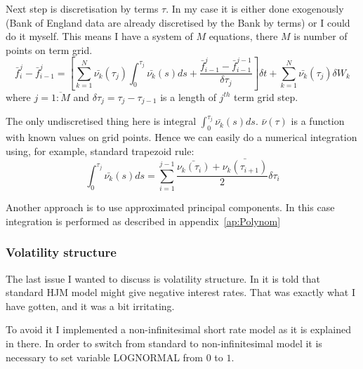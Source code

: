 \documentclass[11pt]{article} %
\begin{document}
Next step is discretisation by terms $\tau$. In my case it is either done exogenously (Bank of England data are already discretised by the Bank by terms) or I could do it myself. This means I have a system of $M$ equations, there $M$ is number of points on term grid.
\begin{equation} \label{eq:hjm_musiela_multidim_discrete}
\bar{f}_i^j - \bar{f}_{i-1}^j = \left[\sum_{k=1}^N\bar{\nu_k}(\tau_j)\int_{0}^{\tau_j}\bar{\nu_k}(s)ds+ \frac{\bar{f}_{i-1}^j-\bar{f}_{i-1}^{j-1}}{\delta\tau_j}\right]\delta t + \sum_{k=1}^N\bar{\nu_k}(\tau_j)\delta W_{k}
\end{equation}
where $j = \overline{1:M}$ and $\delta\tau_j = \tau_j - \tau_{j-1}$ is a length of $j^{th}$ term grid step. 

The only undiscretised thing here is integral $\int_{0}^{\tau_j}\bar{\nu_k}(s)ds$. $\bar{\nu}(\tau)$ is a function with known values on grid points. Hence we can easily do a numerical integration using, for example, standard trapezoid rule:
\begin{equation}
\int_{0}^{\tau_j}\bar{\nu_k}(s)ds = \sum_{i=1}^{j-1}\frac{\bar{\nu_k(\tau_i)}+\bar{\nu_k(\tau_{i+1})}}{2}\delta\tau_i
\end{equation}

Another approach is to use approximated principal components. In this case integration is performed as described in appendix~\ref{ap:Polynom}

\subsubsection{Volatility structure}
The last issue I wanted to discuss is volatility structure. In \cite[par. 37.15]{PWoQF06} it is told that standard HJM model might give negative interest rates. That was exactly what I have gotten, and it was a bit irritating. 

To avoid it I implemented a non-infinitesimal short rate model as it is explained in there. In order to switch from standard to non-infinitesimal model it is necessary to set variable LOGNORMAL from $0$ to $1$.
\end{document}
